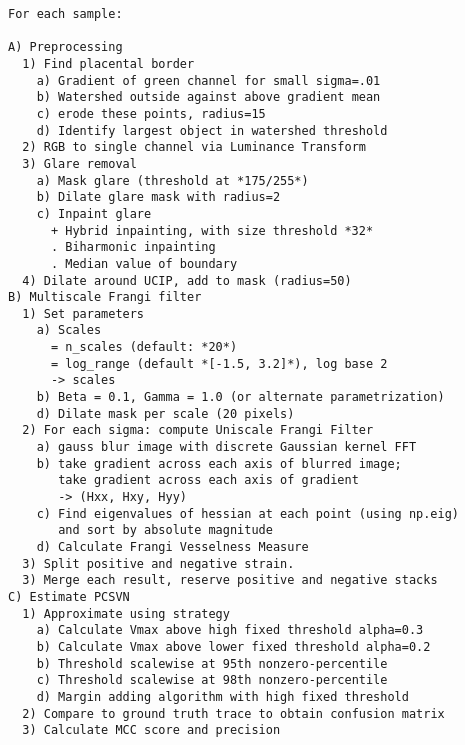     \begin{spacing}{1}
    \begin{small}
    \begin{verbatim}
For each sample:

A) Preprocessing
  1) Find placental border
  	a) Gradient of green channel for small sigma=.01
  	b) Watershed outside against above gradient mean
  	c) erode these points, radius=15
  	d) Identify largest object in watershed threshold
  2) RGB to single channel via Luminance Transform
  3) Glare removal
    a) Mask glare (threshold at *175/255*)
    b) Dilate glare mask with radius=2
    c) Inpaint glare
      + Hybrid inpainting, with size threshold *32*
      . Biharmonic inpainting
      . Median value of boundary
  4) Dilate around UCIP, add to mask (radius=50)
B) Multiscale Frangi filter
  1) Set parameters
    a) Scales
      = n_scales (default: *20*)
      = log_range (default *[-1.5, 3.2]*), log base 2
      -> scales
    b) Beta = 0.1, Gamma = 1.0 (or alternate parametrization)
    d) Dilate mask per scale (20 pixels)
  2) For each sigma: compute Uniscale Frangi Filter
    a) gauss blur image with discrete Gaussian kernel FFT
    b) take gradient across each axis of blurred image;
       take gradient across each axis of gradient
       -> (Hxx, Hxy, Hyy)
    c) Find eigenvalues of hessian at each point (using np.eig)
       and sort by absolute magnitude 
    d) Calculate Frangi Vesselness Measure
  3) Split positive and negative strain.
  3) Merge each result, reserve positive and negative stacks
C) Estimate PCSVN
  1) Approximate using strategy
    a) Calculate Vmax above high fixed threshold alpha=0.3
    b) Calculate Vmax above lower fixed threshold alpha=0.2
    b) Threshold scalewise at 95th nonzero-percentile
    c) Threshold scalewise at 98th nonzero-percentile
    d) Margin adding algorithm with high fixed threshold
  2) Compare to ground truth trace to obtain confusion matrix
  3) Calculate MCC score and precision
\end{verbatim}
    \end{small}
\end{spacing}
